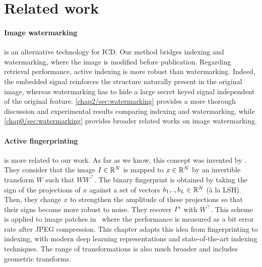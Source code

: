 \section{Related work}\label{chap2/sec:related}

\paragraph*{Image watermarking} is an alternative technology for ICD. 
Our method bridges indexing and watermarking, where the image is modified before publication.
Regarding retrieval performance, active indexing is more robust than watermarking.
Indeed, the embedded signal reinforces the structure naturally present in the original image, whereas watermarking has to hide a large secret keyed signal independent of the original feature.
\autoref{chap2/sec:watermarking} provides a more thorough discussion and experimental results comparing indexing and watermarking, while \autoref{chap0/sec:watermarking} provides broader related works on image watermarking.

\paragraph*{Active \gls*{fingerprinting}} is more related to our work.
As far as we know, this concept was invented by \citet{voloshynovskiy2012active}.
They consider that the image $I\in \mathbb{R}^N$ is mapped to $x \in \mathbb{R}^N$ by an invertible transform $W$ such that $WW^\top$.
The binary fingerprint is obtained by taking the sign of the projections of $x$ against a set of vectors $b_1,., b_L \in \mathbb{R}^N$ (à la LSH).
Then, they change $x$ to strengthen the amplitude of these projections so that their signs become more robust to noise.
They recover $I^\star$ with $W^\top$.
This scheme is applied to image patches in~\citep{7533094} where the performance is measured as a bit error rate after JPEG compression. 
This chapter adapts this idea from fingerprinting to indexing, with modern deep learning representations and state-of-the-art indexing techniques. 
The range of transformations is also much broader and includes geometric transforms.
